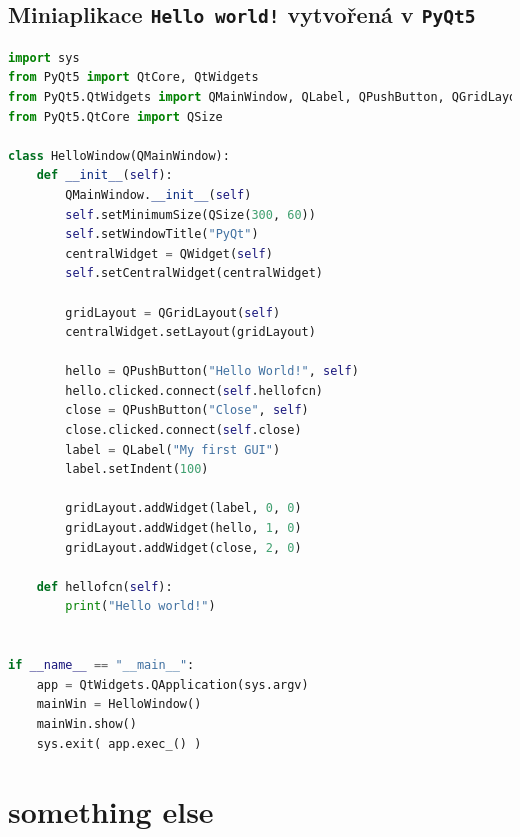 \documentclass[a4paper, 12pt]{article}
\begin{document}
\subsection{Miniaplikace \texttt{Hello world!} vytvořená v \texttt{PyQt5}}
\begin{lstlisting}[language=Python]
import sys
from PyQt5 import QtCore, QtWidgets
from PyQt5.QtWidgets import QMainWindow, QLabel, QPushButton, QGridLayout, QWidget
from PyQt5.QtCore import QSize

class HelloWindow(QMainWindow):
    def __init__(self):
        QMainWindow.__init__(self)
        self.setMinimumSize(QSize(300, 60))
        self.setWindowTitle("PyQt")
        centralWidget = QWidget(self)
        self.setCentralWidget(centralWidget)

        gridLayout = QGridLayout(self)
        centralWidget.setLayout(gridLayout)

        hello = QPushButton("Hello World!", self)
        hello.clicked.connect(self.hellofcn)
        close = QPushButton("Close", self)
        close.clicked.connect(self.close)
        label = QLabel("My first GUI")
        label.setIndent(100)

        gridLayout.addWidget(label, 0, 0)
        gridLayout.addWidget(hello, 1, 0)
        gridLayout.addWidget(close, 2, 0)

    def hellofcn(self):
        print("Hello world!")


if __name__ == "__main__":
    app = QtWidgets.QApplication(sys.argv)
    mainWin = HelloWindow()
    mainWin.show()
    sys.exit( app.exec_() )
\end{lstlisting}
%
\section{something else}
\label{PrilohaB}
\end{document}
